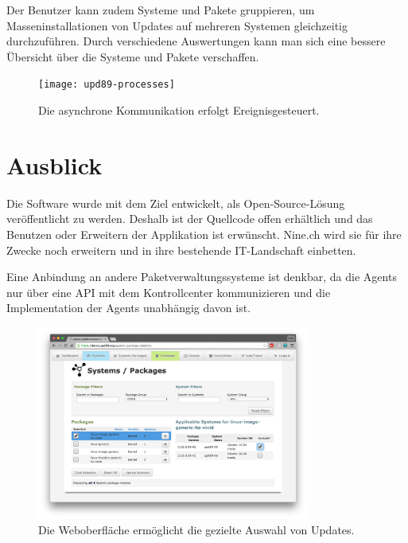 Der Benutzer kann zudem Systeme und Pakete gruppieren, um Masseninstallationen von Updates auf mehreren Systemen gleichzeitig durchzuführen. Durch verschiedene Auswertungen kann man sich eine bessere Übersicht über die Systeme und Pakete verschaffen.

\begin{figure}
  \centering
    \texttt{[image: upd89-processes]}
  \caption{Die asynchrone Kommunikation erfolgt Ereignisgesteuert.}
  \label{fig:processes}
\end{figure}

\section*{Ausblick}

Die Software wurde mit dem Ziel entwickelt, als Open-Source-Lösung veröffentlicht zu werden. Deshalb ist der Quellcode offen erhältlich und das Benutzen oder Erweitern der Applikation ist erwünscht. Nine.ch wird sie für ihre Zwecke noch erweitern und in ihre bestehende IT-Landschaft einbetten.

Eine Anbindung an andere Paketverwaltungssysteme ist denkbar, da die Agents nur über eine API mit dem Kontrollcenter kommunizieren und die Implementation der Agents unabhängig davon ist.

\begin{figure}
  \centering
    \includegraphics[width=0.8\textwidth]{screenshot_comboview}
  \caption{Die Weboberfläche ermöglicht die gezielte Auswahl von Updates.}
  \label{fig:userinterface}
\end{figure}